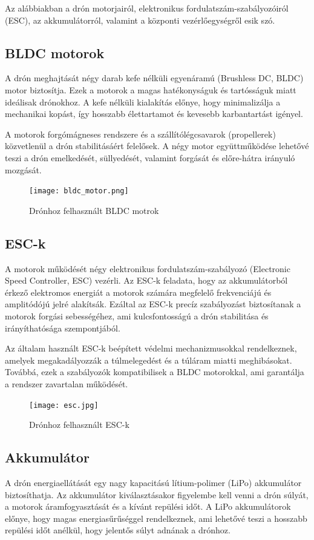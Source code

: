 Az alábbiakban a drón motorjairól, elektronikus fordulatszám-szabályozóiról (ESC), az akkumulátorról, valamint a központi vezérlőegységről esik szó.

\subsection{BLDC motorok}
A drón meghajtását négy darab kefe nélküli egyenáramú (Brushless DC, BLDC) motor biztosítja. Ezek a motorok a magas hatékonyságuk és tartósságuk miatt ideálisak drónokhoz. A kefe nélküli kialakítás előnye, hogy minimalizálja a mechanikai kopást, így hosszabb élettartamot és kevesebb karbantartást igényel.

A motorok forgómágneses rendszere és a szállítólégcsavarok (propellerek) közvetlenül a drón stabilitásáért felelősek. A négy motor együttműködése lehetővé teszi a drón emelkedését, süllyedését, valamint forgását és előre-hátra irányuló mozgását.


\begin{figure}[H]
	\centering
	\texttt{[image: bldc\_motor.png]}
	\caption{Drónhoz felhasznált BLDC motrok}
	\label{Drónhoz felhasznált BLDC motrok}
\end{figure}

\subsection{ESC-k}
A motorok működését négy elektronikus fordulatszám-szabályozó (Electronic Speed Controller, ESC) vezérli. Az ESC-k feladata, hogy az akkumulátorból érkező elektromos energiát a motorok számára megfelelő frekvenciájú és amplitódójú jelré alakítsák. Ezáltal az ESC-k precíz szabályozást biztosítanak a motorok forgási sebességéhez, ami kulcsfontosságú a drón stabilitása és irányíthatósága szempontjából.

Az általam használt ESC-k beépített védelmi mechanizmusokkal rendelkeznek, amelyek megakadályozzák a túlmelegedést és a túláram miatti meghibásokat. Továbbá, ezek a szabályozók kompatibilisek a BLDC motorokkal, ami garantálja a rendszer zavartalan működését.

\begin{figure}[H]
	\centering
	\texttt{[image: esc.jpg]}
	\caption{Drónhoz felhasznált ESC-k}
	\label{Drónhoz felhasznált ESC-k}
\end{figure}

\subsection{Akkumulátor}
A drón energiaellátását egy nagy kapacitású lítium-polimer (LiPo) akkumulátor biztosíthatja. Az akkumulátor kiválasztásakor figyelembe kell venni a drón súlyát, a motorok áramfogyasztását és a kívánt repülési időt. A LiPo akkumulátorok előnye, hogy magas energiasűrűséggel rendelkeznek, ami lehetővé teszi a hosszabb repülési időt anélkül, hogy jelentős súlyt adnának a drónhoz.

